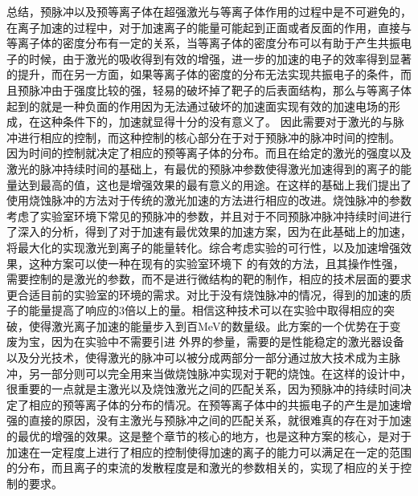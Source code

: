 总结，预脉冲以及预等离子体在超强激光与等离子体作用的过程中是不可避免的，在离子加速的过程中，对于加速离子的能量可能起到正面或者反面的作用，直接与等离子体的密度分布有一定的关系，当等离子体的密度分布可以有助于产生共振电子的时候，由于激光的吸收得到有效的增强，进一步的加速的电子的效率得到显著的提升，而在另一方面，如果等离子体的密度的分布无法实现共振电子的条件，而且预脉冲由于强度比较的强，轻易的破坏掉了靶子的后表面结构，那么与等离子体起到的就是一种负面的作用因为无法通过破坏的加速面实现有效的加速电场的形成，在这种条件下的，加速就显得十分的没有意义了。 因此需要对于激光的与脉冲进行相应的控制，而这种控制的核心部分在于对于预脉冲的脉冲时间的控制。 因为时间的控制就决定了相应的预等离子体的分布。而且在给定的激光的强度以及激光的脉冲持续时间的基础上，有最优的预脉冲参数使得激光加速得到的离子的能量达到最高的值，这也是增强效果的最有意义的用途。在这样的基础上我们提出了使用烧蚀脉冲的方法对于传统的激光加速的方法进行相应的改进。烧蚀脉冲的参数考虑了实验室环境下常见的预脉冲的参数，并且对于不同预脉冲脉冲持续时间进行了深入的分析，得到了对于加速有最优效果的加速方案，因为在此基础上的加速，将最大化的实现激光到离子的能量转化。综合考虑实验的可行性，以及加速增强效果，这种方案可以使一种在现有的实验室环境下 的有效的方法，且其操作性强，需要控制的是激光的参数，而不是进行微结构的靶的制作，相应的技术层面的要求更合适目前的实验室的环境的需求。对比于没有烧蚀脉冲的情况，得到的加速的质子的能量提高了响应的3倍以上的量。相信这种技术可以在实验中取得相应的突破，使得激光离子加速的能量步入到百MeV的数量级。此方案的一个优势在于变废为宝，因为在实验中不需要引进 外界的参量，需要的是性能稳定的激光器设备以及分光技术，使得激光的脉冲可以被分成两部分一部分通过放大技术成为主脉冲，另一部分则可以完全用来当做烧蚀脉冲实现对于靶的烧蚀。在这样的设计中，很重要的一点就是主激光以及烧蚀激光之间的匹配关系，因为预脉冲的持续时间决定了相应的预等离子体的分布的情况。在预等离子体中的共振电子的产生是加速增强的直接的原因，没有主激光与预脉冲之间的匹配关系，就很难真的存在对于加速的最优的增强的效果。这是整个章节的核心的地方，也是这种方案的核心，是对于加速在一定程度上进行了相应的控制使得加速的离子的能力可以满足在一定的范围的分布，而且离子的束流的发散程度是和激光的参数相关的，实现了相应的关于控制的要求。



